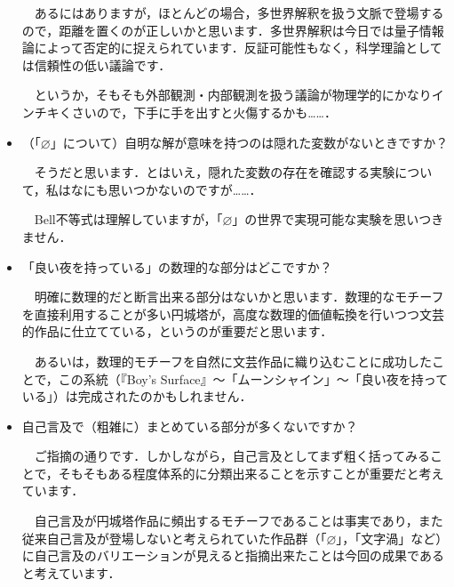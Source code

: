 \documentclass[10pt, a5paper, twoside]{jsarticle}
\begin{document}
\begin{itemize}
			\vspace{1mm}

			　あるにはありますが，ほとんどの場合，多世界解釈を扱う文脈で登場するので，距離を置くのが正しいかと思います．多世界解釈は今日では量子情報論によって否定的に捉えられています．反証可能性もなく，科学理論としては信頼性の低い議論です．
			
			　というか，そもそも外部観測・内部観測を扱う議論が物理学的にかなりインチキくさいので，下手に手を出すと火傷するかも……．

			\vspace{1mm}

			\item （「$ \varnothing$」について）自明な解が意味を持つのは隠れた変数がないときですか？

			\vspace{2mm}

			　そうだと思います．とはいえ，隠れた変数の存在を確認する実験について，私はなにも思いつかないのですが……．

			　Bell不等式は理解していますが，「$ \varnothing$」の世界で実現可能な実験を思いつきません．

			\vspace{2mm}

			\item 「良い夜を持っている」の数理的な部分はどこですか？

			\vspace{1mm}

			　明確に数理的だと断言出来る部分はないかと思います．数理的なモチーフを直接利用することが多い円城塔が，高度な数理的価値転換を行いつつ文芸的作品に仕立てている，というのが重要だと思います．

			　あるいは，数理的モチーフを自然に文芸作品に織り込むことに成功したことで，この系統（『Boy's Surface』〜「ムーンシャイン」〜「良い夜を持っている」）は完成されたのかもしれません．

			\vspace{2mm}

			\item 自己言及で（粗雑に）まとめている部分が多くないですか？

			\vspace{1mm}

			　ご指摘の通りです．しかしながら，自己言及としてまず粗く括ってみることで，そもそもある程度体系的に分類出来ることを示すことが重要だと考えています．

			　自己言及が円城塔作品に頻出するモチーフであることは事実であり，また従来自己言及が登場しないと考えられていた作品群（「$ \varnothing $」，「文字渦」など）に自己言及のバリエーションが見えると指摘出来たことは今回の成果であると考えています．


\end{itemize}
\end{document}
